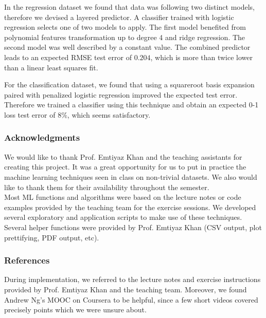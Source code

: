 \documentclass{article} %
\begin{document}
In the regression dataset we found that data was following two distinct models, therefore we devised a layered predictor. A classifier trained with logistic regression selects one of two models to apply. The first model benefited from polynomial features transformation up to degree 4 and ridge regression. The second model was well described by a constant value. The combined predictor leads to an expected RMSE test error of $0.204$, which is more than twice lower than a linear least squares fit.

For the classification dataset, we found that using a squareroot basis expansion paired with penalized logistic regression improved the expected test error. Therefore we trained a classifier using this technique and obtain an expected 0-1 loss test error of $8\%$, which seems satisfactory.

\subsubsection*{Acknowledgments}
  We would like to thank Prof. Emtiyaz Khan and the teaching assistants for creating this project. It was a great opportunity for us to put in practice the machine learning techniques seen in class on non-trivial datasets. We also would like to thank them for their availability throughout the semester.\\
  Most ML functions and algorithms were based on the lecture notes or code examples provided by the teaching team for the exercise sessions. We developed several exploratory and application scripts to make use of these techniques. Several helper functions were provided by Prof. Emtiyaz Khan (CSV output, plot prettifying, PDF output, etc).

\subsubsection*{References}
  During implementation, we referred to the lecture notes and exercise instructions provided by Prof. Emtiyaz Khan and the teaching team. Moreover, we found Andrew Ng's MOOC on Coursera to be helpful, since a few short videos covered precisely points which we were unsure about.
\end{document}
